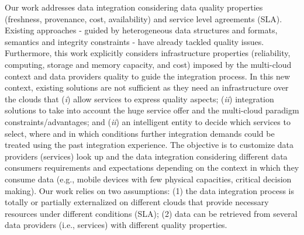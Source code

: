 Our work addresses data integration considering data quality properties (freshness, provenance, cost, availability) and service level agreements (SLA). 
%
Existing approaches  - guided by heterogeneous data structures and formats, semantics and integrity constraints - have already tackled quality issues.
%
Furthermore, this work explicitly considers infrastructure properties (reliability, computing, storage and memory capacity, and cost) imposed by the multi-cloud context and data providers quality to guide the integration process. 
%
In this new context, existing solutions are not sufficient as they need an infrastructure over the clouds that 
(\textit{i}) allow services to express quality aspects; 
(\textit{ii}) integration solutions to take into account the huge service offer and the multi-cloud paradigm constraints/advantages; and
(\textit{ii}) an intelligent entity to decide which services to select, where and in which conditions further integration demands could be treated using the past integration experience. 
%
The objective is to customize data providers (services) look up and the data integration considering different data consumers requirements and expectations depending on the context in which  they consume data (e.g., mobile devices with few physical capacities, critical decision making). Our work relies on two assumptions: (1) the data integration process is totally or partially externalized on different clouds that provide necessary resources under different conditions (SLA); (2) data can be retrieved from several data providers (i.e., services) with different quality properties.

